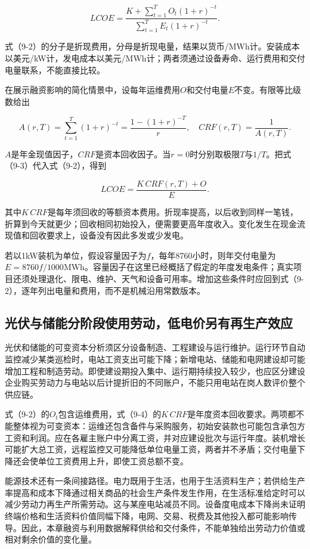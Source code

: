 \documentclass[UTF8,fontset=windows,12pt,a4paper,oneside,openany]{ctexbook}
\begin{document}
\[
LCOE=\frac{K+\sum_{t=1}^{T}O_t(1+r)^{-t}}
{\sum_{t=1}^{T}E_t(1+r)^{-t}}.
\tag{9-2}
\]

式（9-2）的分子是折现费用，分母是折现电量，结果以货币/MWh计。安装成本以美元/kW计，发电成本以美元/MWh计；两者须通过设备寿命、运行费用和交付电量联系，不能直接比较。

在展示融资影响的简化情景中，设每年运维费用\(O\)和交付电量\(E\)不变。有限等比级数给出

\[
A(r,T)=\sum_{t=1}^{T}(1+r)^{-t}
=\frac{1-(1+r)^{-T}}{r},
\quad
CRF(r,T)=\frac{1}{A(r,T)}.
\tag{9-3}
\]

\(A\)是年金现值因子，\(CRF\)是资本回收因子。当\(r=0\)时分别取极限\(T\)与\(1/T\)。把式（9-3）代入式（9-2），得到

\[
LCOE=\frac{K\,CRF(r,T)+O}{E}.
\tag{9-4}
\]

其中\(K\,CRF\)是每年须回收的等额资本费用。折现率提高，以后收到同样一笔钱，折算到今天就更少；回收相同初始投入，便需要更高年度收入。变化发生在现金流现值和回收要求上，设备没有因此多发或少发电。

若以1kW装机为单位，假设容量因子为\(f\)，每年8760小时，则年交付电量为\(E=8760f/1000\)MWh。容量因子在这里已经概括了假定的年度发电条件；真实项目还须处理退化、限电、维护、天气和设备可用率。增加这些条件时应回到式（9-2），逐年列出电量和费用，而不是机械沿用常数版本。

\subsection{光伏与储能分阶段使用劳动，低电价另有再生产效应}

光伏和储能的可变资本分析须区分设备制造、工程建设与运行维护。运行环节自动监控减少某类巡检时，电站工资支出可能下降；新增电站、储能和电网建设却可能增加工程和制造劳动。即使建设期投入集中、运行期持续投入较少，也应区分建设企业购买劳动力与电站以后计提折旧的不同账户，不能只用电站在岗人数评价整个供应链。

式（9-2）的$O_t$包含运维费用，式（9-4）的$K\,CRF$是年度资本回收要求。两项都不能整体视为可变资本：运维还包含备件与采购服务，初始安装款也可能包含承包方工资和利润。应在各雇主账户中分离工资，并对应建设批次与运行年度。装机增长可能扩大总工资，远程监控又可能降低单位电量工资，两者并不矛盾；交付电量下降还会使单位工资费用上升，即使工资总额不变。

能源技术还有一条间接路径。电力既用于生活，也用于生活资料生产；若供给生产率提高和成本下降通过相关商品的社会生产条件发生作用，在生活标准给定时可以减少劳动力再生产所需劳动。这与某座电站减员不同。设备度电成本下降尚未证明终端价格和生活资料价值同幅下降，电网、交易、税费及其他投入都可能影响传导。因此，本章融资与利用数据解释供给和交付条件，不能单独给出劳动力价值或相对剩余价值的变化量。
\end{document}
